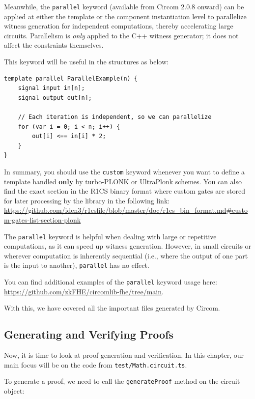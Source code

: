 \documentclass[../lecture-notes-148x210.tex]{subfiles}
\begin{document}
Meanwhile, the \texttt{parallel} keyword (available from Circom 2.0.8 onward) can be applied at either the template or
the component instantiation level to parallelize witness generation for independent computations, thereby accelerating large circuits.
Parallelism is \emph{only} applied to the C++ witness generator; it does not affect the constraints themselves.

This keyword will be useful in the structures as below:

\begin{lstlisting}[language=Circom,basicstyle=\ttfamily\footnotesize]
template parallel ParallelExample(n) {
    signal input in[n];
    signal output out[n];

    // Each iteration is independent, so we can parallelize
    for (var i = 0; i < n; i++) {
        out[i] <== in[i] * 2;
    }
}
\end{lstlisting}

In summary, you should use the \texttt{custom} keyword whenever you want to define a template handled \textbf{only} by turbo-PLONK or UltraPlonk schemes.
You can also find the exact section in the R1CS binary format where custom gates are stored for later processing by the library in the following link: \\
\url{https://github.com/iden3/r1csfile/blob/master/doc/r1cs_bin_format.md\#custom-gates-list-section-plonk}

The \texttt{parallel} keyword is helpful when dealing with large or repetitive computations, as it can speed up witness generation.
However, in small circuits or wherever computation is inherently sequential (i.e., where the output of one part is the input to another), \texttt{parallel} has no effect.

You can find additional examples of the \texttt{parallel} keyword usage here: \url{https://github.com/zkFHE/circomlib-fhe/tree/main}.

With this, we have covered all the important files generated by Circom.

\subsection{Generating and Verifying Proofs}

Now, it is time to look at proof generation and verification.
In this chapter, our main focus will be on the code from \texttt{test/Math.circuit.ts}.

To generate a proof, we need to call the \texttt{generateProof} method on the circuit object:
\end{document}
